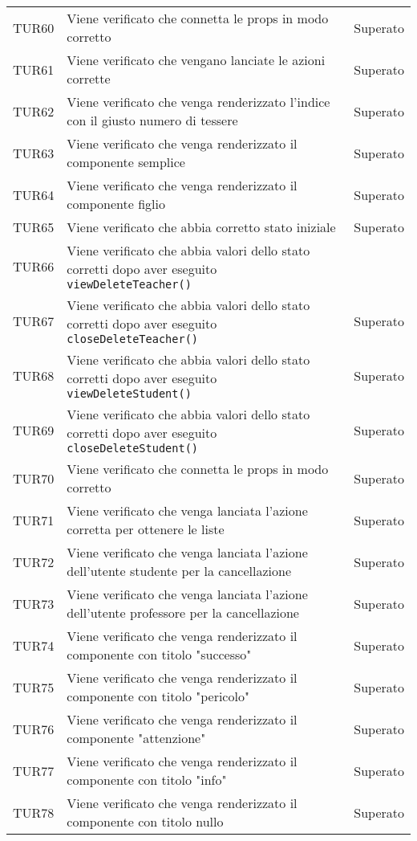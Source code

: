 \documentclass[PianoDiQualifica.tex]{subfiles}
\begin{document}
\begin{longtable}[H]{P{2cm}P{8.5cm}P{3cm}}
	TUR60 & Viene verificato che connetta le props in modo corretto & Superato \\ 
	TUR61 & Viene verificato che vengano lanciate le azioni corrette & Superato \\ 
	TUR62 & Viene verificato che venga renderizzato l'indice con il giusto numero di tessere & Superato \\ 
	TUR63 & Viene verificato che venga renderizzato il componente semplice & Superato \\ 
	TUR64 & Viene verificato che venga renderizzato il componente figlio & Superato \\ 
	TUR65 & Viene verificato che abbia corretto stato iniziale & Superato \\ 
	TUR66 & Viene verificato che abbia valori dello stato corretti dopo aver eseguito \texttt{viewDeleteTeacher()} \\ 
	TUR67 & Viene verificato che abbia valori dello stato corretti dopo aver eseguito \texttt{closeDeleteTeacher()} & Superato \\ 
	TUR68 & Viene verificato che abbia valori dello stato corretti dopo aver eseguito \texttt{viewDeleteStudent()} & Superato \\ 
	TUR69 & Viene verificato che abbia valori dello stato corretti dopo aver eseguito \texttt{closeDeleteStudent()} & Superato \\ 
	TUR70 & Viene verificato che connetta le props in modo corretto & Superato \\ 
	TUR71 & Viene verificato che venga lanciata l'azione corretta per ottenere le liste & Superato \\ 
	TUR72 & Viene verificato che venga lanciata l'azione dell'utente studente per la cancellazione & Superato \\ 
	TUR73 & Viene verificato che venga lanciata l'azione dell'utente professore per la cancellazione & Superato \\ 
	TUR74 & Viene verificato che venga renderizzato il componente con titolo "successo" & Superato \\ 
	TUR75 & Viene verificato che venga renderizzato il componente con titolo "pericolo" & Superato \\ 
	TUR76 & Viene verificato che venga renderizzato il componente "attenzione"  & Superato \\ 
	TUR77 & Viene verificato che venga renderizzato il componente con titolo "info"  & Superato \\ 
	TUR78 & Viene verificato che venga renderizzato il componente con titolo nullo & Superato \\ 

\end{longtable}
\end{document}
